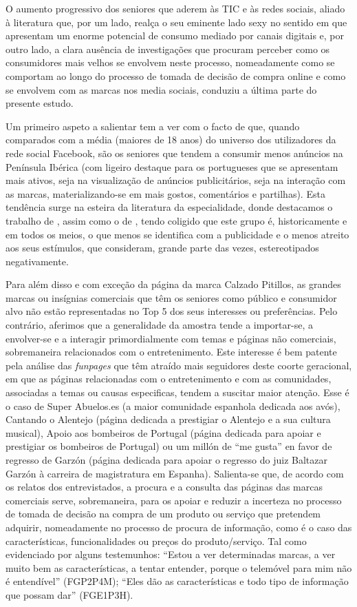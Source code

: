 \documentclass[portuguese]{textolivre}
\begin{document}
O aumento progressivo dos seniores que aderem às TIC e às redes sociais, aliado à literatura que, por um lado, realça o seu eminente lado sexy no sentido em que apresentam um enorme potencial de consumo mediado por canais digitais \cite{friemel2016, nunan2019} e, por outro lado, a clara ausência de investigações que procuram perceber como os consumidores mais velhos se envolvem neste processo, nomeadamente como se comportam ao longo do processo de tomada de decisão de compra online e como se envolvem com as marcas nos media sociais, conduziu a última parte do presente estudo.

Um primeiro aspeto a salientar tem a ver com o facto de que, quando comparados com a média (maiores de 18 anos) do universo dos utilizadores da rede social Facebook, são os seniores que tendem a consumir menos anúncios na Península Ibérica (com ligeiro destaque para os portugueses que se apresentam mais ativos, seja na visualização de anúncios publicitários, seja na interação com as marcas, materializando-se em mais gostos, comentários e partilhas). Esta tendência surge na esteira da literatura da especialidade, donde destacamos o trabalho de \textcite{antunes2014}, assim como o de \textcite{reams2016}, tendo coligido que este grupo é, historicamente e em todos os meios, o que menos se identifica com a publicidade e o menos atreito aos seus estímulos, que consideram, grande parte das vezes, estereotipados negativamente.

Para além disso e com exceção da página da marca Calzado Pitillos, as grandes marcas ou insígnias comerciais que têm os seniores como público e consumidor alvo não estão representadas no Top 5 dos seus interesses ou preferências. Pelo contrário, aferimos que a generalidade da amostra tende a importar-se, a envolver-se e a interagir primordialmente com temas e páginas não comerciais, sobremaneira relacionados com o entretenimento. Este interesse é bem patente pela análise das \emph{funpages} que têm atraído mais seguidores deste coorte geracional, em que as páginas relacionadas com o entretenimento e com as comunidades, associadas a temas ou causas especificas, tendem a suscitar maior atenção. Esse é o caso de Super Abuelos.es (a maior comunidade espanhola dedicada aos avós), Cantando o Alentejo (página dedicada a prestigiar o Alentejo e a sua cultura musical), Apoio aos bombeiros de Portugal (página dedicada para apoiar e prestigiar os bombeiros de Portugal) ou um millón de “me gusta” en favor de regresso de Garzón (página dedicada para apoiar o regresso do juiz Baltazar Garzón à carreira de magistratura em Espanha). Salienta-se que, de acordo com os relatos dos entrevistados, a procura e a consulta das páginas das marcas comerciais serve, sobremaneira, para os apoiar e reduzir a incerteza no processo de tomada de decisão na compra de um produto ou serviço que pretendem adquirir, nomeadamente no processo de procura de informação, como é o caso das características, funcionalidades ou preços do produto/serviço. Tal como evidenciado por alguns testemunhos: “Estou a ver determinadas marcas, a ver muito bem as características, a tentar entender, porque o telemóvel para mim não é entendível” (FGP2P4M); “Eles dão as características e todo tipo de informação que possam dar” (FGE1P3H).  
\end{document}
